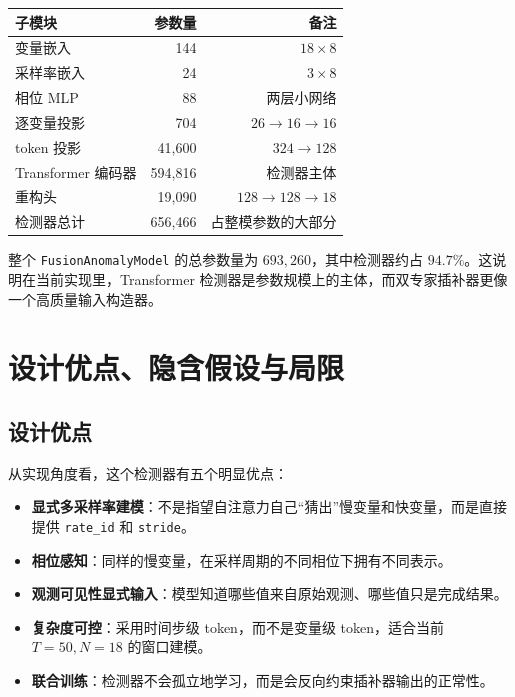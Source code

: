 \documentclass[UTF8]{ctexart}
\begin{document}
\begin{center}
\small
\begin{tabular}{lrr}
\toprule
子模块 & 参数量 & 备注 \\
\midrule
变量嵌入 & 144 & \(18\times 8\) \\
采样率嵌入 & 24 & \(3\times 8\) \\
相位 MLP & 88 & 两层小网络 \\
逐变量投影 & 704 & \(26\rightarrow 16\rightarrow 16\) \\
token 投影 & 41{,}600 & \(324\rightarrow 128\) \\
Transformer 编码器 & 594{,}816 & 检测器主体 \\
重构头 & 19{,}090 & \(128\rightarrow 128\rightarrow 18\) \\
\midrule
检测器总计 & 656{,}466 & 占整模参数的大部分 \\
\bottomrule
\end{tabular}
\end{center}

整个 \texttt{FusionAnomalyModel} 的总参数量为 \(693{,}260\)，其中检测器约占 \(94.7\%\)。这说明在当前实现里，Transformer 检测器是参数规模上的主体，而双专家插补器更像一个高质量输入构造器。

\section{设计优点、隐含假设与局限}

\subsection{设计优点}

从实现角度看，这个检测器有五个明显优点：
\begin{itemize}
    \item \textbf{显式多采样率建模}：不是指望自注意力自己“猜出”慢变量和快变量，而是直接提供 \texttt{rate\_id} 和 \texttt{stride}。
    \item \textbf{相位感知}：同样的慢变量，在采样周期的不同相位下拥有不同表示。
    \item \textbf{观测可见性显式输入}：模型知道哪些值来自原始观测、哪些值只是完成结果。
    \item \textbf{复杂度可控}：采用时间步级 token，而不是变量级 token，适合当前 \(T=50,N=18\) 的窗口建模。
    \item \textbf{联合训练}：检测器不会孤立地学习，而是会反向约束插补器输出的正常性。
\end{itemize}
\end{document}

